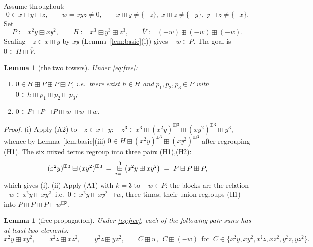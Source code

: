 \documentclass[11pt]{article}
\newtheorem{lemma}[theorem]{Lemma}
\theoremstyle{definition}
\theoremstyle{remark}
\newcommand{\bp}{\boxplus}
\newcommand{\bigboxplus}{\mathop{\mbox{\normalsize$\boxplus$}}\limits}
\begin{document}
Assume throughout:
\begin{equation}\label{eq:free}
  0\in x\bp y\bp z,\qquad w=xyz\neq0,\qquad
  x\bp y\neq\{-z\},\;x\bp z\neq\{-y\},\;y\bp z\neq\{-x\}.
  \tag{F}
\end{equation}
Set
\[
  P:=x^2y\bp xy^2,\qquad H:=x^3\bp y^3\bp z^3,\qquad
  \overline V:=(-w)\bp(-w)\bp(-w).
\]
Scaling $-z\in x\bp y$ by $xy$ (Lemma~\ref{lem:basic}(i)) gives
$-w\in P$. The goal is $0\in H\bp\overline V$.

\begin{lemma}[the two towers]\label{lem:towers}
Under \eqref{eq:free}:
\begin{enumerate}[label=\textup{(\roman*)}]
\item $0\in H\bp P\bp P\bp P$, i.e.\ there exist $h\in H$ and
$p_1,p_2,p_3\in P$ with $0\in h\bp p_1\bp p_2\bp p_3$;
\item $0\in P\bp P\bp P\bp w\bp w\bp w$.
\end{enumerate}
\end{lemma}

\begin{proof}
(i) Apply (A2) to $-z\in x\bp y$:
$-z^3\in x^3\bp(x^2y)^{\bp3}\bp(xy^2)^{\bp3}\bp y^3$, whence by
Lemma~\ref{lem:basic}(iii)
$0\in H\bp(x^2y)^{\bp3}\bp(xy^2)^{\bp3}$ after regrouping (H1). The six
mixed terms regroup into three pairs (H1),(H2):
\begin{equation}\label{eq:blockP}
  (x^2y)^{\bp3}\bp(xy^2)^{\bp3}
  \;=\;\bigboxplus_{i=1}^{3}\bigl(x^2y\bp xy^2\bigr)
  \;=\;P\bp P\bp P ,
\end{equation}
which gives (i).
(ii) Apply (A1) with $k=3$ to $-w\in P$: the blocks are the relation
$-w\in x^2y\bp xy^2$, i.e.\ $0\in x^2y\bp xy^2\bp w$, three times; their
union regroups (H1) into $P\bp P\bp P\bp w^{\bp3}$.
\end{proof}

\begin{lemma}[free propagation]\label{lem:prop}
Under \eqref{eq:free}, each of the following pair sums has at least two
elements:
\[
  x^2y\bp xy^2,\qquad x^2z\bp xz^2,\qquad y^2z\bp yz^2,\qquad
  C\bp w,\ \ C\bp(-w)\ \ \text{for }\
  C\in\{x^2y,xy^2,x^2z,xz^2,y^2z,yz^2\}.
\]
\end{lemma}
\end{document}
